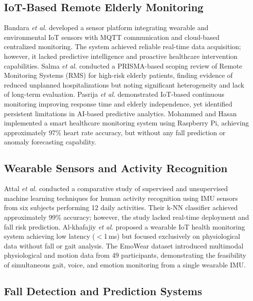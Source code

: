 \documentclass[conference]{IEEEtran}
\begin{document}
\subsection{IoT-Based Remote Elderly Monitoring}

Bandara \textit{et al.} \cite{bandara2020} developed a sensor platform integrating wearable and environmental IoT sensors with MQTT communication and cloud-based centralized monitoring. The system achieved reliable real-time data acquisition; however, it lacked predictive intelligence and proactive healthcare intervention capabilities. Salma \textit{et al.} \cite{salma2025} conducted a PRISMA-based scoping review of Remote Monitoring Systems (RMS) for high-risk elderly patients, finding evidence of reduced unplanned hospitalizations but noting significant heterogeneity and lack of long-term evaluation. Pasrija \textit{et al.} \cite{pasrija2025} demonstrated IoT-based continuous monitoring improving response time and elderly independence, yet identified persistent limitations in AI-based predictive analytics. Mohammed and Hasan \cite{mohammed2022} implemented a smart healthcare monitoring system using Raspberry Pi, achieving approximately 97\% heart rate accuracy, but without any fall prediction or anomaly forecasting capability.

\subsection{Wearable Sensors and Activity Recognition}

Attal \textit{et al.} \cite{attal2015} conducted a comparative study of supervised and unsupervised machine learning techniques for human activity recognition using IMU sensors from six subjects performing 12 daily activities. Their k-NN classifier achieved approximately 99\% accuracy; however, the study lacked real-time deployment and fall risk prediction. Al-khafajiy \textit{et al.} \cite{alkhafajiy2019} proposed a wearable IoT health monitoring system achieving low latency ($<$1\,ms) but focused exclusively on physiological data without fall or gait analysis. The EmoWear dataset \cite{rahmani2024} introduced multimodal physiological and motion data from 49 participants, demonstrating the feasibility of simultaneous gait, voice, and emotion monitoring from a single wearable IMU.

\subsection{Fall Detection and Prediction Systems}
\end{document}
